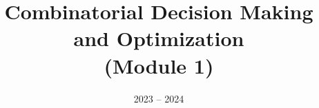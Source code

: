 \documentclass[11pt]{ainotes}
\title{Combinatorial Decision Making\\and Optimization\\(Module 1)}
\date{2023 -- 2024}
\begin{document}
    
    \makenotesfront
    
    
    \eoc
\end{document}
